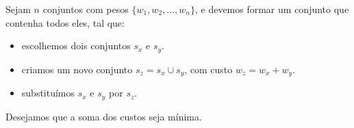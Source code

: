 \documentclass[12pt]{beamer}
\begin{document}
\begin{frame}
\begin{bloco}

Sejam $n$ conjuntos com pesos $\{w_1, w_2, \dots, w_n\}$, e devemos formar um conjunto que contenha todos eles, tal que:

\begin{itemize}
    \item escolhemos dois conjuntos $s_x$ e $s_y$.
    \item criamos um novo conjunto $s_z = s_x \cup s_y$, com custo $w_z = w_x + w_y$.
    \item substituímos $s_x$ e $s_y$ por $s_z$.
\end{itemize}

Desejamos que a soma dos custos seja mínima.

\end{bloco}
\end{frame}
\end{document}
